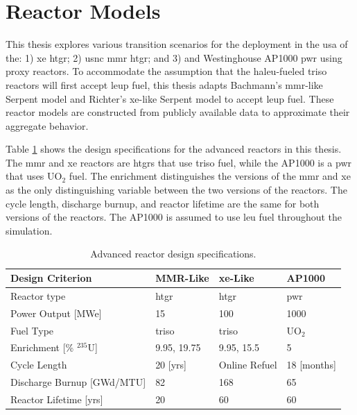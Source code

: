 \section{Reactor Models}
\label{sec:reactor_models}

This thesis explores various transition scenarios for the deployment in the \gls{usa} of the: 1) \gls{xe} \gls{htgr}; 2) \gls{usnc} \gls{mmr} \gls{htgr}; and 3) and Westinghouse AP1000 \gls{pwr} using proxy reactors. To accommodate the assumption that the \gls{haleu}-fueled \gls{triso} reactors will first accept \gls{leup} fuel, this thesis adapts Bachmann's \gls{mmr}-like Serpent model \cite{bachmann_mmr_like_2023} and Richter's \gls{xe}-like Serpent model \cite{richter_xe100_like} to accept \gls{leup} fuel. These reactor models are constructed from publicly available data to approximate their aggregate behavior.

Table \ref{tab:ar_defs} shows the design specifications for the advanced reactors in this thesis. The \gls{mmr} and \gls{xe} reactors are \gls{htgr}s that use \gls{triso} fuel, while the AP1000 is a \gls{pwr} that uses UO$_2$ fuel. The enrichment distinguishes the versions of the \gls{mmr} and \gls{xe} as the only distinguishing variable between the two versions of the reactors. The cycle length, discharge burnup, and reactor lifetime are the same for both versions of the reactors. The AP1000 is assumed to use \gls{leu} fuel throughout the simulation.

\begin{table}[H]
   \centering
   \caption{Advanced reactor design specifications.}
   \label{tab:ar_defs}
   \begin{tabular}{l l l l}
      \hline
      \textbf{Design Criterion} & \textbf{MMR-Like} \cite{usnc_design_2021} & \textbf{\gls{xe}-Like} \cite{nuscale_chapter_2018} & \textbf{AP1000} \\
      \hline
      Reactor type & \gls{htgr} & \gls{htgr} & \gls{pwr} \\
      Power Output [MWe] & 15 & 100 & 1000 \\
      Fuel Type & \gls{triso} & \gls{triso} & UO$_2$ \\
      Enrichment [\% $^{235}$U] & 9.95, 19.75 & 9.95, 15.5 & 5 \\
      Cycle Length & 20 [yrs] & Online Refuel & 18 [months] \\
      Discharge Burnup [GWd/MTU] & 82 & 168 & 65 \\
      Reactor Lifetime [yrs] & 20 & 60 & 60 \\
      \hline
   \end{tabular}
\end{table}

